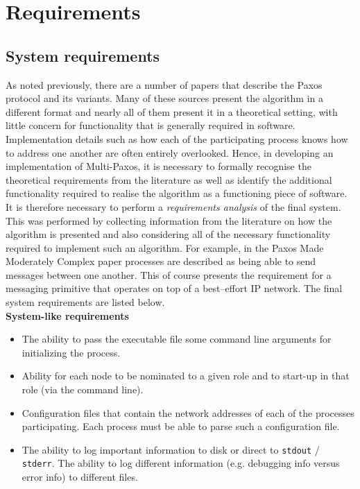 

\section{Requirements}

\subsection{System requirements}

As noted previously, there are a number of papers that describe the Paxos protocol and its variants. Many of these sources present the algorithm in a different format and nearly all of them present it in a theoretical setting, with little concern for functionality that is generally required in software. Implementation details such as how each of the participating process knows how to address one another are often entirely overlooked. Hence, in developing an implementation of Multi-Paxos, it is necessary to formally recognise the theoretical requirements from the literature as well as identify the additional functionality required to realise the algorithm as a functioning piece of software. \\

It is therefore necessary to perform a \emph{requirements analysis} of the final system. This was performed by collecting information from the literature on how the algorithm is presented and also considering all of the necessary functionality required to implement such an algorithm. For example, in the Paxos Made Moderately Complex paper processes are described as being able to send messages between one another. This of course presents the requirement for a messaging primitive that operates on top of a best--effort IP network. The final system requirements are listed below. \\

\textbf{System-like requirements}
\begin{itemize}
  \item The ability to pass the executable file some command line arguments for initializing the process.
  \item Ability for each node to be nominated to a given role and to start-up in that role (via the command line).
  \item Configuration files that contain the network addresses of each of the processes participating. Each process must be able to parse such a configuration file.
  \item The ability to log important information to disk or direct to \texttt{stdout} / \texttt{stderr}. The ability to log different information (e.g. debugging info versus error info) to different files.
\end{itemize}

